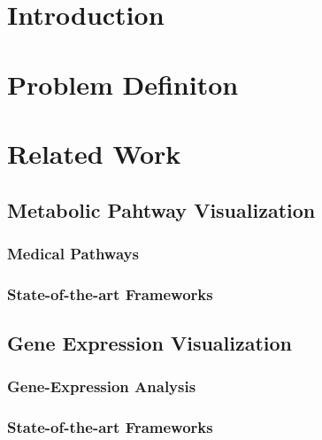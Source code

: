 \chapter{Introduction}

\chapter{Problem Definiton}


\chapter{Related Work}

\section{Metabolic Pahtway Visualization}

\subsection{Medical Pathways}
\subsection{State-of-the-art Frameworks}

\section{Gene Expression Visualization}

\subsection{Gene-Expression Analysis}
\subsection{State-of-the-art Frameworks}

